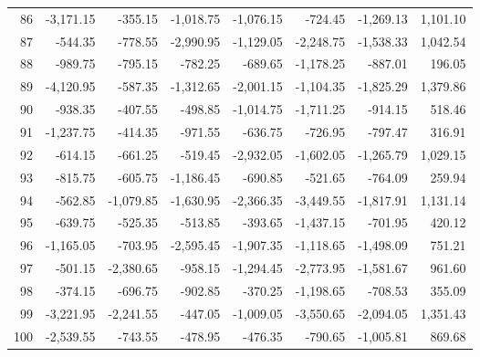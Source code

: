 \begin{longtable}{rrrrrrrr}
86 & -3,171.15 & -355.15 & -1,018.75 & -1,076.15 & -724.45 & -1,269.13 & 1,101.10  \\
87 & -544.35 & -778.55 & -2,990.95 & -1,129.05 & -2,248.75 & -1,538.33 & 1,042.54  \\
88 & -989.75 & -795.15 & -782.25 & -689.65 & -1,178.25 & -887.01 & 196.05  \\
89 & -4,120.95 & -587.35 & -1,312.65 & -2,001.15 & -1,104.35 & -1,825.29 & 1,379.86  \\
90 & -938.35 & -407.55 & -498.85 & -1,014.75 & -1,711.25 & -914.15 & 518.46  \\
91 & -1,237.75 & -414.35 & -971.55 & -636.75 & -726.95 & -797.47 & 316.91  \\
92 & -614.15 & -661.25 & -519.45 & -2,932.05 & -1,602.05 & -1,265.79 & 1,029.15  \\
93 & -815.75 & -605.75 & -1,186.45 & -690.85 & -521.65 & -764.09 & 259.94  \\
94 & -562.85 & -1,079.85 & -1,630.95 & -2,366.35 & -3,449.55 & -1,817.91 & 1,131.14  \\
95 & -639.75 & -525.35 & -513.85 & -393.65 & -1,437.15 & -701.95 & 420.12  \\
96 & -1,165.05 & -703.95 & -2,595.45 & -1,907.35 & -1,118.65 & -1,498.09 & 751.21  \\
97 & -501.15 & -2,380.65 & -958.15 & -1,294.45 & -2,773.95 & -1,581.67 & 961.60  \\
98 & -374.15 & -696.75 & -902.85 & -370.25 & -1,198.65 & -708.53 & 355.09  \\
99 & -3,221.95 & -2,241.55 & -447.05 & -1,009.05 & -3,550.65 & -2,094.05 & 1,351.43  \\
100 & -2,539.55 & -743.55 & -478.95 & -476.35 & -790.65 & -1,005.81 & 869.68  \\

\end{longtable}

